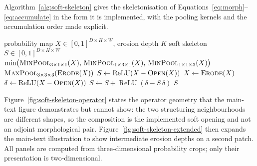 Algorithm~\ref{alg:soft-skeleton} gives the skeletonisation of
Equations~\eqref{eq:morph}--\eqref{eq:accumulate} in the form it is implemented, with the
pooling kernels and the accumulation order made explicit.

\begin{algorithm}[htbp]
  \caption[Differentiable soft skeletonisation]{Differentiable soft skeletonisation, after Shit
  et al.~\cite{shit2021cldice}. \textsc{MinPool} and \textsc{MaxPool} are unit-stride pooling
  with shape-preserving padding; the three directional minimum pools compose to the
  six-neighbour erosion of Equation~\eqref{eq:morph}, and the cubic maximum pool is the
  26-neighbour dilation. Every operation is differentiable, so gradient reaches $X$ through each
  retained residual. Called on the student probability map and on the thresholded teacher tree
  with $K=10$.}
  \label{alg:soft-skeleton}
  \begin{algorithmic}[1]
    \Require probability map $X\in[0,1]^{D\times H\times W}$, erosion depth $K$
    \Ensure soft skeleton $S\in[0,1]^{D\times H\times W}$
      \State \Return $\min\!\big(\textsc{MinPool}_{3\times1\times1}(X),\,
                                 \textsc{MinPool}_{1\times3\times1}(X),\,
                                 \textsc{MinPool}_{1\times1\times3}(X)\big)$
    \EndFunction
      \State \Return $\textsc{MaxPool}_{3\times3\times3}(\Call{Erode}{X})$
    \EndFunction
    \Statex
    \State $S \gets \operatorname{ReLU}\!\left(X-\Call{Open}{X}\right)$
      \State $X \gets \Call{Erode}{X}$ 
      \State $\delta \gets \operatorname{ReLU}\!\left(X-\Call{Open}{X}\right)$
      \State $S \gets S+\operatorname{ReLU}\!\left(\delta-S\,\delta\right)$
    \EndFor
    \State \Return $S$
  \end{algorithmic}
\end{algorithm}

Figure~\ref{fig:soft-skeleton-operator} states the operator geometry that the main-text
figure demonstrates but cannot show: the two structuring neighbourhoods are different shapes,
so the composition is the implemented soft opening and not an adjoint morphological pair.
Figure~\ref{fig:soft-skeleton-extended} then expands the main-text illustration to show
intermediate erosion depths on a second patch. All panels are computed from three-dimensional
probability crops; only their presentation is two-dimensional.

